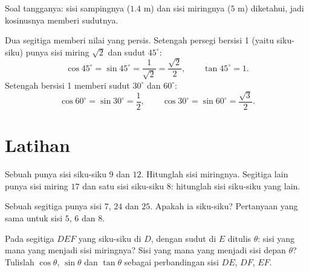 \begin{omfigure}

{\small Soal tangganya: sisi sampingnya ($1.4$ m) dan sisi
miringnya ($5$ m) diketahui, jadi kosinusnya memberi sudutnya.}
\end{omfigure}

\begin{example}\label{ex:g9:trig:special}
Dua segitiga memberi nilai yang persis. Setengah persegi bersisi 1
(yaitu  siku-siku) punya sisi miring $\sqrt2$ dan
sudut $45^\circ$:
\[
\cos 45^\circ = \sin 45^\circ = \frac{1}{\sqrt2} = \frac{\sqrt2}{2},
\qquad \tan 45^\circ = 1 .
\]
Setengah  bersisi 1 memberi sudut $30^\circ$ dan
$60^\circ$:
\[
\cos 60^\circ = \sin 30^\circ = \frac12,
\qquad
\cos 30^\circ = \sin 60^\circ = \frac{\sqrt3}{2}.
\]
\end{example}

\section{Latihan}

\begin{exercise}[$\star$]\label{exo:g9:trig:1}
Sebuah  punya sisi siku-siku $9$ dan $12$. Hitunglah
sisi miringnya. Segitiga lain punya sisi miring $17$ dan satu sisi
siku-siku $8$: hitunglah sisi siku-siku yang lain.
\end{exercise}

\begin{exercise}[$\star$]\label{exo:g9:trig:2}
Sebuah segitiga punya sisi $7$, $24$ dan $25$. Apakah ia siku-siku?
Pertanyaan yang sama untuk sisi $5$, $6$ dan $8$.
\end{exercise}

\begin{exercise}[$\star$]\label{exo:g9:trig:3}
Pada segitiga $DEF$ yang siku-siku di $D$, dengan sudut di $E$ ditulis
$\theta$: sisi yang mana yang menjadi sisi miringnya? Sisi yang mana
yang menjadi sisi depan $\theta$? Tulislah $\cos\theta$, $\sin\theta$
dan $\tan\theta$ sebagai perbandingan sisi $DE$, $DF$, $EF$.
\end{exercise}

